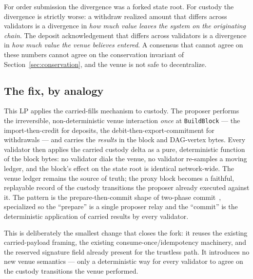 For order submission the divergence was a forked state root. For
custody the divergence is strictly worse: a withdraw realized amount
that differs across validators is a divergence in \emph{how much value
leaves the system on the originating chain}. The deposit acknowledgement
that differs across validators is a divergence in \emph{how much value
the venue believes entered}. A consensus that cannot agree on these
numbers cannot agree on the conservation invariant of
Section~\ref{sec:conservation}, and the venue is not safe to
decentralize.

\subsection{The fix, by analogy}

This LP applies the carried-fills mechanism to custody. The proposer
performs the irreversible, non-deterministic venue interaction
\emph{once} at \texttt{BuildBlock} --- the import-then-credit for
deposits, the debit-then-export-commitment for withdrawals --- and
carries the \emph{results} in the block and DAG-vertex bytes. Every
validator then applies the carried custody delta as a pure,
deterministic function of the block bytes: no validator dials the
venue, no validator re-samples a moving ledger, and the block's effect
on the state root is identical network-wide. The venue ledger remains
the source of truth; the proxy block becomes a faithful, replayable
record of the custody transitions the proposer already executed
against it. The pattern is the prepare-then-commit shape of two-phase
commit~\cite{gray1978}, specialized so the ``prepare'' is a single
proposer relay and the ``commit'' is the deterministic application of
carried results by every validator.

This is deliberately the smallest change that closes the fork: it
reuses the existing carried-payload framing, the existing
consume-once/idempotency machinery, and the reserved signature field
already present for the trustless path. It introduces no new venue
semantics --- only a deterministic way for every validator to agree on
the custody transitions the venue performed.
